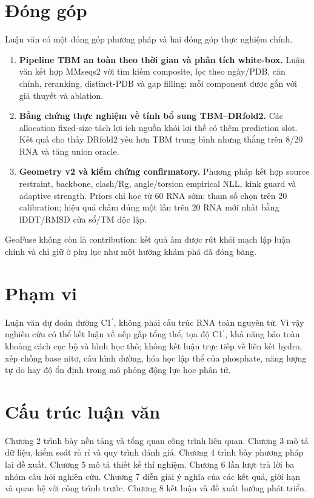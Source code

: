 \documentclass[12pt,a4paper,oneside]{report}
\newcommand{\cprime}{C1$^{\prime}$}
\begin{document}
\section{Đóng góp}

Luận văn có một đóng góp phương pháp và hai đóng góp thực nghiệm chính.

\begin{enumerate}
  \item \textbf{Pipeline TBM an toàn theo thời gian và phân tích white-box.} Luận văn
  kết hợp MMseqs2 với tìm kiếm composite, lọc theo ngày/PDB, căn chỉnh, reranking,
  distinct-PDB và gap filling; mỗi component được gắn với giả thuyết và ablation.

  \item \textbf{Bằng chứng thực nghiệm về tính bổ sung TBM--DRfold2.} Các allocation
  fixed-size tách lợi ích nguồn khỏi lợi thế có thêm prediction slot. Kết quả cho thấy
  DRfold2 yếu hơn TBM trung bình nhưng thắng trên 8/20 RNA và tăng union oracle.

  \item \textbf{Geometry v2 và kiểm chứng confirmatory.} Phương pháp kết hợp source
  restraint, backbone, clash/Rg, angle/torsion empirical NLL, kink guard và adaptive
  strength. Priors chỉ học từ 60 RNA sớm; tham số chọn trên 20 calibration; hiệu quả
  chấm đúng một lần trên 20 RNA mới nhất bằng lDDT/RMSD cửa sổ/TM độc lập.
\end{enumerate}

GeoFuse không còn là contribution: kết quả âm được rút khỏi mạch lập luận chính và chỉ
giữ ở phụ lục như một hướng khám phá đã đóng băng.

\section{Phạm vi}

Luận văn dự đoán đường \cprime{}, không phải cấu trúc RNA toàn nguyên tử. Vì vậy nghiên
cứu có thể kết luận về nếp gấp tổng thể, tọa độ \cprime{}, khả năng bảo toàn khoảng cách
cục bộ và hình học thô; không kết luận trực tiếp về liên kết hydro, xếp chồng base nitơ, cấu
hình đường, hóa học lập thể của phosphate, năng lượng tự do hay độ ổn định trong mô
phỏng động lực học phân tử.

\section{Cấu trúc luận văn}

Chương 2 trình bày nền tảng và tổng quan công trình liên quan. Chương 3 mô tả dữ liệu,
kiểm soát rò rỉ và quy trình đánh giá. Chương 4 trình bày phương pháp lai đề xuất.
Chương 5 mô tả thiết kế thí nghiệm. Chương 6 lần lượt trả lời ba nhóm câu hỏi nghiên cứu.
Chương 7 diễn giải ý nghĩa của các kết quả, giới hạn và quan hệ với công trình trước.
Chương 8 kết luận và đề xuất hướng phát triển.
\end{document}
